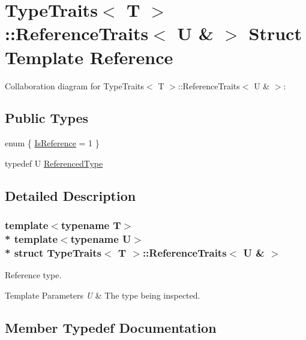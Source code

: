 \hypertarget{structTypeTraits_1_1ReferenceTraits_3_01U_01_6_01_4}{}\section{Type\+Traits$<$ T $>$\+:\+:Reference\+Traits$<$ U \& $>$ Struct Template Reference}
\label{structTypeTraits_1_1ReferenceTraits_3_01U_01_6_01_4}


Collaboration diagram for Type\+Traits$<$ T $>$\+:\+:Reference\+Traits$<$ U \& $>$\+:
\subsection*{Public Types}
\begin{DoxyCompactItemize}
\item 
enum \{ \hyperlink{structTypeTraits_1_1ReferenceTraits_3_01U_01_6_01_4_afeb50cdbf179951fb5a06c5d01578a05a183b1dc69f7498d77e15cd12d89d95aa}{Is\+Reference} = 1
 \}
\item 
typedef U \hyperlink{structTypeTraits_1_1ReferenceTraits_3_01U_01_6_01_4_a85db6c22d4420b470505b872e6ad6bcd}{Referenced\+Type}
\end{DoxyCompactItemize}


\subsection{Detailed Description}
\subsubsection*{template$<$typename T$>$\\*
template$<$typename U$>$\\*
struct Type\+Traits$<$ T $>$\+::\+Reference\+Traits$<$ U \& $>$}

Reference type. 
\begin{DoxyTemplParams}{Template Parameters}
{\em U} & The type being inspected. \\
\hline
\end{DoxyTemplParams}


\subsection{Member Typedef Documentation}

